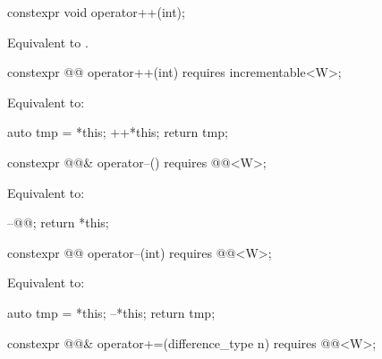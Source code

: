 \begin{itemdecl}
constexpr void operator++(int);
\end{itemdecl}

\begin{itemdescr}
\pnum
\effects
Equivalent to .
\end{itemdescr}

\begin{itemdecl}
constexpr @@ operator++(int) requires incrementable<W>;
\end{itemdecl}

\begin{itemdescr}
\pnum
\effects
Equivalent to:
\begin{codeblock}
auto tmp = *this;
++*this;
return tmp;
\end{codeblock}
\end{itemdescr}

\begin{itemdecl}
constexpr @@& operator--() requires @@<W>;
\end{itemdecl}

\begin{itemdescr}
\pnum
\effects
Equivalent to:
\begin{codeblock}
--@@;
return *this;
\end{codeblock}
\end{itemdescr}

\begin{itemdecl}
constexpr @@ operator--(int) requires @@<W>;
\end{itemdecl}

\begin{itemdescr}
\pnum
\effects
Equivalent to:
\begin{codeblock}
auto tmp = *this;
--*this;
return tmp;
\end{codeblock}
\end{itemdescr}

\begin{itemdecl}
constexpr @@& operator+=(difference_type n)
  requires @@<W>;
\end{itemdecl}


